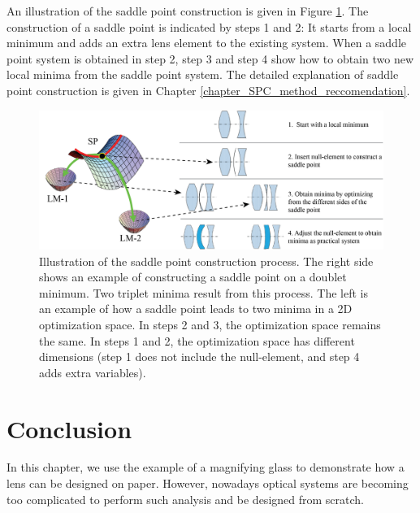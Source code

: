 An illustration of the saddle point construction is given in Figure \ref{fig: spc_illustration}. The construction of a saddle point is indicated by steps 1 and 2: It starts from a local minimum and adds an extra lens element to the existing system. When a saddle point system is obtained in step 2, step 3 and step 4 show how to obtain two new local minima from the saddle point system. The detailed explanation of saddle point construction is given in Chapter \ref{chapter_SPC_method_reccomendation}. 

\begin{figure}
    \centering
    \includegraphics[scale=0.58]{chapter-1/figures/spc_illustrate.png}
    \caption{Illustration of the saddle point construction process. The right side shows an example of constructing a saddle point on a doublet minimum. Two triplet minima result from this process. The left is an example of how a saddle point leads to two minima in a 2D optimization space. In steps 2 and 3, the optimization space remains the same. In steps 1 and 2, the optimization space has different dimensions (step 1 does not include the null-element, and step 4 adds extra variables). }
    \label{fig: spc_illustration}
\end{figure} 



\section{Conclusion}
In this chapter, we use the example of a magnifying glass to demonstrate how a lens can be designed on paper. However, nowadays optical systems are becoming too complicated to perform such analysis and be designed from scratch. 


